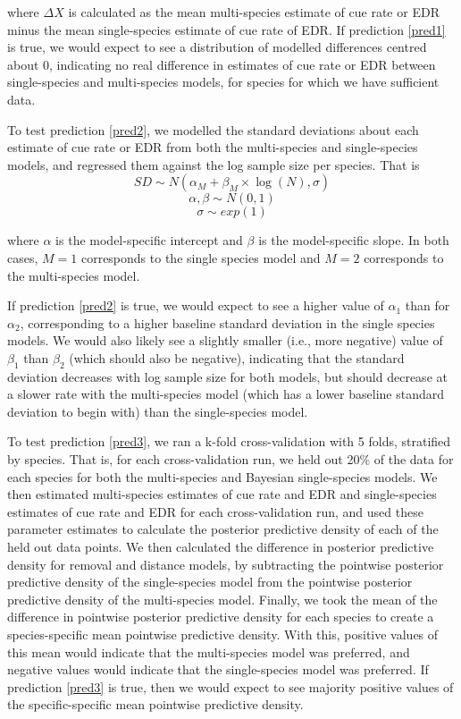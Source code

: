 \documentclass[12pt]{article}
\begin{document}
where $\Delta X$ is calculated as the mean multi-species estimate of cue rate or EDR minus the mean single-species estimate of cue rate of EDR.
If prediction \ref{pred1} is true, we would expect to see a distribution of modelled differences centred about 0, indicating no real difference in estimates of cue rate or EDR between single-species and multi-species models, for species for which we have sufficient data.

\par To test prediction \ref{pred2}, we modelled the standard deviations about each estimate of cue rate or EDR from both the multi-species and single-species models, and regressed them against the log sample size per species.
That is
$$SD \sim N(\alpha_M + \beta_M\times \log(N), \sigma)$$
$$\alpha, \beta \sim N(0,1)$$
$$\sigma \sim exp(1)$$

where $\alpha$ is the model-specific intercept and $\beta$ is the model-specific slope.
In both cases, $M=1$ corresponds to the single species model and $M=2$ corresponds to the multi-species model.

\par If prediction \ref{pred2} is true, we would expect to see a higher value of $\alpha_1$ than for $\alpha_2$, corresponding to a higher baseline standard deviation in the single species models.
We would also likely see a slightly smaller (i.e., more negative) value of $\beta_1$ than $\beta_2$ (which should also be negative), indicating that the standard deviation decreases with log sample size for both models, but should decrease at a slower rate with the multi-species model (which has a lower baseline standard deviation to begin with) than the single-species model.

\par To test prediction \ref{pred3}, we ran a k-fold cross-validation with 5 folds, stratified by species. That is, for each cross-validation run, we held out 20\% of the data for each species for both the multi-species and Bayesian single-species models. 
We then estimated multi-species estimates of cue rate and EDR and single-species estimates of cue rate and EDR for each cross-validation run, and used these parameter estimates to calculate the posterior predictive density of each of the held out data points. 
We then calculated the difference in posterior predictive density for removal and distance models, by subtracting the pointwise posterior predictive density of the single-species model from the pointwise posterior predictive density of the multi-species model.
Finally, we took the mean of the difference in pointwise posterior predictive density for each species to create a species-specific mean pointwise predictive density.
With this, positive values of this mean would indicate that the multi-species model was preferred, and negative values would indicate that the single-species model was preferred.
If prediction \ref{pred3} is true, then we would expect to see majority positive values of the specific-specific mean pointwise predictive density.
\end{document}
